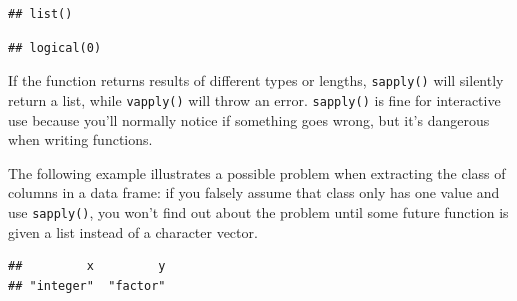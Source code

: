\begin{Shaded}
\begin{Highlighting}[]
\NormalTok{(}
\end{Highlighting}
\end{Shaded}

\begin{verbatim}
## list()
\end{verbatim}

\begin{Shaded}
\begin{Highlighting}[]
\NormalTok{(}\NormalTok{(}\NormalTok{))}
\end{Highlighting}
\end{Shaded}

\begin{verbatim}
## logical(0)
\end{verbatim}

If the function returns results of different types or lengths,
\texttt{sapply()} will silently return a list, while \texttt{vapply()}
will throw an error. \texttt{sapply()} is fine for interactive use
because you'll normally notice if something goes wrong, but it's
dangerous when writing functions.

The following example illustrates a possible problem when extracting the
class of columns in a data frame: if you falsely assume that class only
has one value and use \texttt{sapply()}, you won't find out about the
problem until some future function is given a list instead of a
character vector.

\begin{Shaded}
\begin{Highlighting}[]
\StringTok{ }\NormalTok{(} \OperatorTok{:}\NormalTok{, }\NormalTok{ letters[}\OperatorTok{:}\NormalTok{])}
\end{Highlighting}
\end{Shaded}

\begin{verbatim}
##         x         y 
## "integer"  "factor"
\end{verbatim}

\begin{Shaded}
\begin{Highlighting}[]
\NormalTok{(}\NormalTok{))}
\end{Highlighting}
\end{Shaded}


